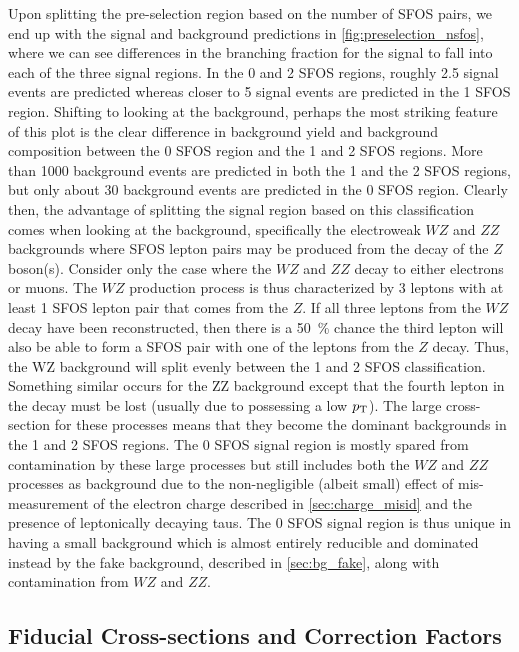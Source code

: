 Upon splitting the pre-selection region based on the number of SFOS
pairs, we end up with the signal and background predictions in
\fig\ref{fig:preselection_nsfos}, where we can see differences
in the branching fraction for the signal to fall into
each of the three signal regions.
In the 0 and 2 SFOS regions, roughly 2.5 signal events are predicted
whereas closer to 5 signal events are predicted in the 1 SFOS region.
Shifting to looking at the background, perhaps the most striking 
feature of this plot is the 
clear difference in background yield and background composition
between the 0 SFOS region and the 1 and 2 SFOS regions.
More than 1000 background events are predicted in both the 1 and
the 2 SFOS regions, but only about 30 background events are
predicted in the 0 SFOS region.
Clearly then, the advantage of splitting the signal region based on this
classification comes when looking at the background, specifically the
electroweak $WZ$ and $ZZ$ backgrounds where SFOS lepton pairs may be
produced from the decay of the $Z$ boson(s). Consider only the case
where the $WZ$ and $ZZ$ decay to either electrons or muons.  The $WZ$ production
process is thus characterized by 3 leptons with at least 1 SFOS lepton pair
that comes from the $Z$. If all three leptons from the $WZ$ decay have been
reconstructed, then there is a 50~\% chance the third lepton 
will also be able to form a SFOS pair with one of the leptons from the $Z$ decay.
Thus, the WZ background will split evenly between the 1 and 2 SFOS classification.
Something similar occurs for the ZZ background except that the fourth lepton 
in the decay must be lost (usually due to possessing a low $p_{\mathrm{T}}$).
The large cross-section for these processes means that
they become the dominant backgrounds in the 1 and 2 SFOS regions.  
The 0 SFOS signal region is mostly spared from contamination  by 
these large processes but still
includes both the $WZ$ and $ZZ$ processes as background due to the
non-negligible (albeit small) effect of mis-measurement of the electron
charge described in \sec\ref{sec:charge_misid} and the presence
of leptonically decaying taus.  The 0 SFOS signal region
is thus unique in having a small background which is almost entirely
reducible and dominated instead by the fake background,
described in \sec\ref{sec:bg_fake},
along with contamination from $WZ$ and $ZZ$. 






\subsection{Fiducial Cross-sections and Correction Factors}
\label{sec:inputs}

